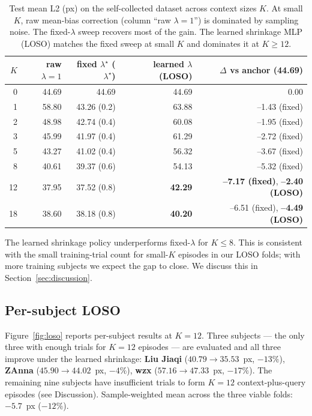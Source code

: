 \begin{table}[t]
\caption{Test mean L2 (px) on the self-collected dataset across context
sizes $K$. At small $K$, raw mean-bias correction (column ``raw $\lambda{=}1$'')
is dominated by sampling noise. The fixed-$\lambda$ sweep recovers most
of the gain. The learned shrinkage MLP (LOSO) matches the fixed sweep
at small $K$ and dominates it at $K \ge 12$.}
\label{tab:shrinkage}
\centering
\small
\begin{tabular}{rrrrr}
\toprule
$K$ & raw $\lambda{=}1$ & fixed $\lambda^\star$ ($\lambda^\star$) & learned $\lambda$ (LOSO) & $\Delta$ vs anchor (44.69)\\
\midrule
0  & 44.69 & 44.69 & 44.69 & 0.00 \\
1  & 58.80 & 43.26 (0.2) & 63.88 & --1.43 (fixed) \\
2  & 48.98 & 42.74 (0.4) & 60.08 & --1.95 (fixed) \\
3  & 45.99 & 41.97 (0.4) & 61.29 & --2.72 (fixed) \\
5  & 43.27 & 41.02 (0.4) & 56.32 & --3.67 (fixed) \\
8  & 40.61 & 39.37 (0.6) & 54.13 & --5.32 (fixed) \\
12 & 37.95 & 37.52 (0.8) & \textbf{42.29} & \textbf{--7.17 (fixed)}, \textbf{--2.40 (LOSO)} \\
18 & 38.60 & 38.18 (0.8) & \textbf{40.20} & --6.51 (fixed), \textbf{--4.49 (LOSO)} \\
\bottomrule
\end{tabular}
\end{table}

The learned shrinkage policy underperforms fixed-$\lambda$ for
$K \le 8$. This is consistent with the small training-trial count for
small-$K$ episodes in our LOSO folds; with more training subjects we
expect the gap to close. We discuss this in Section~\ref{sec:discussion}.

\subsection{Per-subject LOSO}

Figure~\ref{fig:loso} reports per-subject results at $K{=}12$. Three
subjects --- the only three with enough trials for $K{=}12$ episodes ---
are evaluated and all three improve under the learned shrinkage:
\textbf{Liu Jiaqi} ($40.79 \to 35.53$~px, $-13\%$),
\textbf{ZAnna} ($45.90 \to 44.02$~px, $-4\%$),
\textbf{wzx} ($57.16 \to 47.33$~px, $-17\%$).
The remaining nine subjects have insufficient trials to form $K{=}12$
context-plus-query episodes (see Discussion). Sample-weighted mean
across the three viable folds: $-5.7$~px ($-12\%$).

